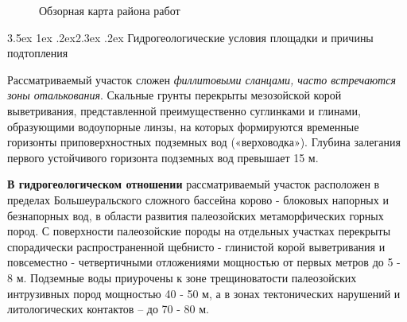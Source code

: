 \documentclass[a4paper,12pt]{article} %
\makeatletter
\renewcommand\section{\@startsection {section}{1}{\parindent}%
	{3.5ex \@plus 1ex \@minus .2ex}{2.3ex \@plus.2ex}%
	{\normalfont\hyphenpenalty=10000\Large\bfseries}}
\makeatother
\begin{document}
\begin{figure}[!h]
	\caption{Обзорная карта района работ}
\end{figure}


\section{Гидрогеологические условия площадки и причины подтопления}

Рассматриваемый участок сложен \textit{филлитовыми сланцами, часто встречаются зоны оталькования}. Скальные грунты перекрыты мезозойской корой выветривания, представленной преимущественно суглинками и глинами, образующими водоупорные линзы, на которых формируются временные горизонты приповерхностных подземных вод («верховодка»). Глубина залегания первого устойчивого горизонта подземных вод превышает 15 м.

\textbf{В гидрогеологическом отношении} рассматриваемый участок расположен в пределах Большеуральского сложного бассейна корово - блоковых напорных и безнапорных вод, в области развития палеозойских метаморфических горных пород. С поверхности палеозойские породы на отдельных участках перекрыты спорадически распространенной щебнисто - глинистой корой выветривания и повсеместно - четвертичными отложениями мощностью от первых метров до 5 - 8 м. Подземные воды приурочены к зоне трещиноватости палеозойских интрузивных пород мощностью 40 - 50 м, а в зонах тектонических нарушений и литологических контактов -- до 70 - 80 м. 
\end{document}
